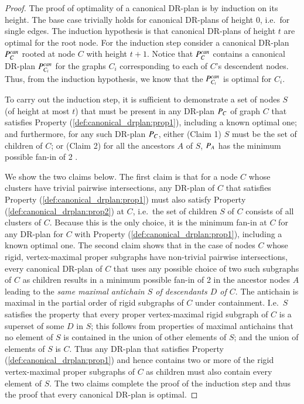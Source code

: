 \begin{proof}
    The proof of optimality of a canonical DR-plan is by induction on its height. The base case trivially holds for canonical DR-plans of height 0, i.e.\ for single edges. The induction hypothesis is that canonical DR-plans of height $t$ are optimal for the root node.
    For the induction step consider a canonical DR-plan $P_{C}^{can}$ rooted at node $C$ with height $t+1$.
    Notice that $P_{C}^{can}$ contains a canonical DR-plan $P_{C_i}^{can}$ for the graphs $C_i$ corresponding to each of $C$'s descendent nodes.
    Thus, from the induction hypothesis, we know that the $P_{C_i}^{can}$ is optimal for $C_i$.

    To carry out the induction step, it is sufficient to demonstrate a set of nodes $S$ (of height at most $t$) that must be present in any DR-plan $P_{C}$ of graph $C$ that satisfies Property (\ref{def:canonical_drplan:prop1}), including a known optimal one; and furthermore, for any such DR-plan $P_{C}$, either (Claim 1) $S$ must be the set of children of $C$; or (Claim 2) for all the ancestors $A$ of $S$, $P_{A}$ has the minimum possible fan-in of 2 .

    We show the two claims below.
    The first claim is that for a node $C$ whose clusters have trivial pairwise intersections, any DR-plan of $C$ that satisfies Property (\ref{def:canonical_drplan:prop1}) must also satisfy Property (\ref{def:canonical_drplan:prop2}) at $C$, i.e.\ the set of children $S$ of $C$ consists of all clusters of $C$.
    Because this is the only choice, it is the minimum fan-in at $C$ for any DR-plan for $C$ with Property (\ref{def:canonical_drplan:prop1}), including a known optimal one.
    The second claim shows that in the case of nodes $C$ whose rigid, vertex-maximal proper subgraphs have  non-trivial pairwise intersections, every canonical DR-plan of $C$ that uses any possible choice of two such subgraphs of $C$ as children results in a minimum possible fan-in of 2 in the ancestor nodes $A$ leading to the \emph{same maximal antichain $S$ of descendants $D$ of $C$}. The antichain is maximal in the partial order of rigid subgraphs of $C$ under containment. I.e.\ $S$ satisfies the property that every proper vertex-maximal rigid subgraph of $C$ is a superset of some $D$ in $S$; this follows from properties of maximal antichains that no element of $S$ is contained in the union of other elements of $S$; and the union of elements of $S$ is $C$. Thus any DR-plan that satisfies Property (\ref{def:canonical_drplan:prop1}) and hence contains two or more of the rigid vertex-maximal proper subgraphs of $C$ as children must also contain every element of $S$. The two claims complete the proof of the induction step and thus the proof that every canonical DR-plan is optimal.




\end{proof}
